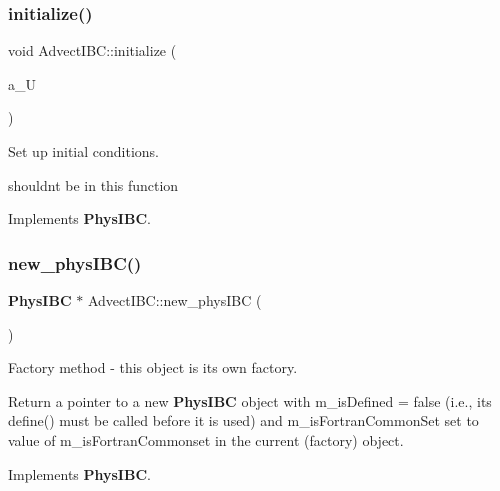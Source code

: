 \subsubsection{\texorpdfstring{initialize()}{initialize()}}
{\footnotesize\ttfamily void Advect\+I\+B\+C\+::initialize (\begin{DoxyParamCaption}\item[{\textbf{ Level\+Data}$<$ \textbf{ F\+Array\+Box} $>$ \&}]{a\+\_\+U }\end{DoxyParamCaption})\hspace{0.3cm}{\ttfamily [virtual]}}



Set up initial conditions. 

shouldn\textquotesingle{}t be in this function 

Implements \textbf{ Phys\+I\+BC}.

\mbox{\label{class_advect_i_b_c_a4d092d4a393e169a87f7df920d09a2b0}} 
\subsubsection{\texorpdfstring{new\+\_\+phys\+I\+B\+C()}{new\_physIBC()}}
{\footnotesize\ttfamily \textbf{ Phys\+I\+BC} $\ast$ Advect\+I\+B\+C\+::new\+\_\+phys\+I\+BC (\begin{DoxyParamCaption}{ }\end{DoxyParamCaption})\hspace{0.3cm}{\ttfamily [virtual]}}



Factory method -\/ this object is its own factory. 

Return a pointer to a new \textbf{ Phys\+I\+BC} object with m\+\_\+is\+Defined = false (i.\+e., its define() must be called before it is used) and m\+\_\+is\+Fortran\+Common\+Set set to value of m\+\_\+is\+Fortran\+Commonset in the current (factory) object. 

Implements \textbf{ Phys\+I\+BC}.

\mbox{\label{class_advect_i_b_c_a5410c1910c93274665fe324a5c6b3be9}} 
